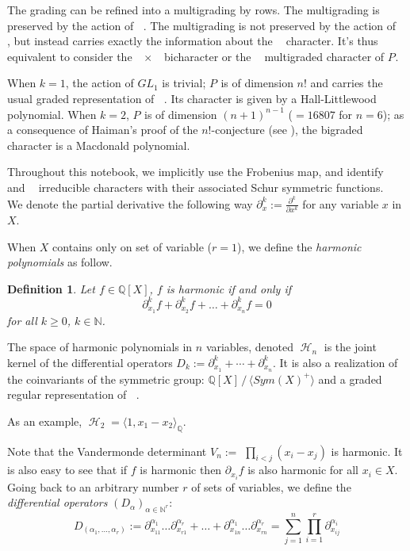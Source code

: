 \documentclass[letter,12pt]{article}
\newcommand{\NN}{\mathbb{N}}
\newcommand{\QQ}{\mathbb{Q}}
\DeclareMathOperator{\Sn}{\mathbb{S}_n}
\DeclareMathOperator{\GLr}{GL_r}
\DeclareMathOperator{\harmonics}{\mathcal{H}}
\newtheorem{definition}{Definition}
\begin{document}
	The grading can be refined into a multigrading by rows. The multigrading is preserved by the action of $\Sn$. The multigrading is not preserved by the action of $\GLr$, but instead carries exactly the information about the $\GLr$ character. It's thus equivalent to consider the $\GLr \times \Sn$ bicharacter or the $\Sn$ multigraded character of $P_{\Sn}$.
	
	When $k=1$, the action of $GL_1$ is trivial; $P_{\Sn}$ is of dimension $n!$ and carries the usual graded representation of $\Sn$. Its character is given by a Hall-Littlewood polynomial.
	When $k=2$, $P_{\Sn}$ is of dimension $(n+1)^{n-1}$ ($=16807$ for $n=6$); as a consequence of Haiman's proof of the $n!$-conjecture (see \cite{Haiman2002}), the bigraded character is a Macdonald polynomial.
	
	Throughout this notebook, we implicitly use the Frobenius map, and identify $\Sn$ and $\GLr$ irreducible characters with their associated Schur symmetric functions. \\
	
	We denote the partial derivative the following way $\partial^k_x := \frac{\partial^k}{\partial x^k}$ for any variable $x$ in $X$.
	
	When $X$ contains only on set of variable ($r=1$), we define the \emph{harmonic polynomials} as follow.
	
	\begin{definition}
		Let $f \in \QQ[X]$, $f$ is \emph{harmonic} if and only if
		$$\partial^k_{x_1} f + \partial^k_{x_2} f + \dots + \partial^k_{x_n} f = 0 $$
		for all $k \geq 0$, $k \in \NN$.
	\end{definition}

	The space of harmonic polynomials in $n$ variables, denoted $\harmonics_{n}$ is the joint kernel of the differential operators $D_k := \partial_{x_1}^k + \cdots + \partial_{x_n}^k$. It is also a realization of the coinvariants of the symmetric group: $\QQ[X]\, /\, \langle Sym(X)^+ \rangle$ and a graded regular representation of $\Sn$. 
	
	As an example, $\harmonics_2 = \langle 1, x_1-x_2 \rangle_\QQ$. 
	
	Note that the Vandermonde determinant $V_n:=$ $\prod_{i<j}(x_i-x_j)$ is harmonic. It is also easy to see that if $f$ is harmonic then $\partial_{x_i} f$ is also harmonic for all $x_i \in X$. \\
	
	Going back to an arbitrary number $r$ of sets of variables, we define the \emph{differential operators} $(D_\alpha)_{\alpha\in \NN^r}$:
	$$D_{(\alpha_1, \dots, \alpha_r)} := \partial_{x_{11}}^{\alpha_1}\dots\partial_{x_{r1}}^{\alpha_r} + \dots + \partial_{x_{1n}}^{\alpha_1}\dots\partial_{x_{rn}}^{\alpha_r} = \sum_{j=1}^{n} \prod_{i=1}^{r} \partial_{x_{ij}}^{\alpha_i}$$
	
\end{document}
